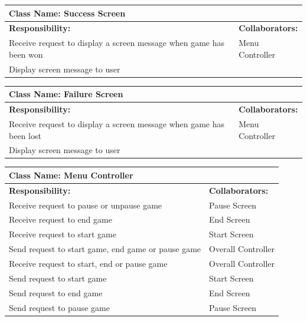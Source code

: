 \documentclass[12pt, titlepage]{article}
\begin{document}
\begin{enumerate}[a)]
	\begin{table}[H]
		\centering
		\begin{tabular}{|p{10cm}|p{5cm}|}
		\hline 
		 \multicolumn{2}{|l|}{\textbf{Class Name: Success Screen}} \\
		\hline
		\textbf{Responsibility:} & \textbf{Collaborators:} \\
		\hline
		 Receive request to display a screen message when game has been won& Menu Controller \\
		\hline
		 Display screen message to user& \\
		\hline
		\end{tabular}
	\end{table}
	
	\begin{table}[H]
		\centering
		\begin{tabular}{|p{10cm}|p{5cm}|}
		\hline 
		 \multicolumn{2}{|l|}{\textbf{Class Name: Failure Screen}} \\
		\hline
		\textbf{Responsibility:} & \textbf{Collaborators:} \\
		\hline
		 Receive request to display a screen message when game has been lost& Menu Controller \\
		\hline
		 Display screen message to user& \\
		\hline
		\end{tabular}
	\end{table}	
	
	\begin{table}[H]
		\centering
		\begin{tabular}{|p{10cm}|p{5cm}|}
		\hline 
		 \multicolumn{2}{|l|}{\textbf{Class Name: Menu Controller}} \\
		\hline
		\textbf{Responsibility:} & \textbf{Collaborators:} \\
		\hline
		 Receive request to pause or unpause game & Pause Screen\\
		\hline
		 Receive request to end game & End Screen\\
		\hline
		 Receive request to start game & Start Screen\\
		\hline
		Send request to start game, end game or pause game & Overall Controller\\
		\hline
		Receive request to start, end or pause game & Overall Controller\\
		\hline
		Send request to start game & Start Screen\\
		\hline
		Send request to end game & End Screen\\
		\hline
		Send request to pause game & Pause Screen\\
		\hline
		\end{tabular}
	\end{table}


\end{enumerate}
\end{document}
